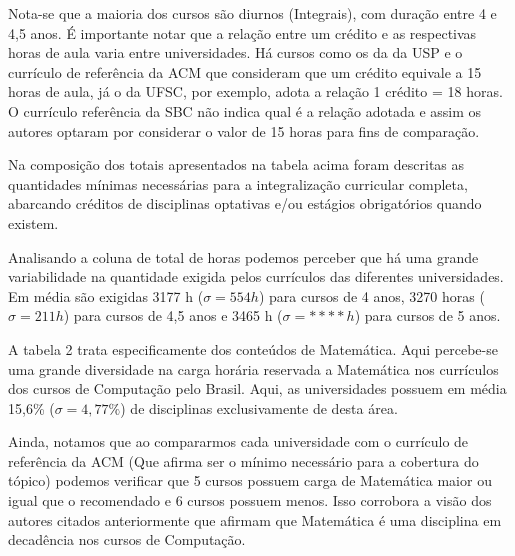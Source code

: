 \documentclass[conference]{IEEEtran}
\begin{document}
	Nota-se que a maioria dos cursos são diurnos (Integrais), com duração entre 4 e 4,5 anos. É importante notar que a relação entre um crédito e as respectivas horas de aula varia entre universidades. Há cursos como os da da USP e o currículo de referência da ACM que consideram que um crédito equivale a 15 horas de aula, já o da UFSC, por exemplo, adota a relação 1 crédito = 18 horas. O currículo referência da SBC não indica qual é a relação adotada e assim os autores optaram por considerar o valor de 15 horas para fins de comparação.

	Na composição dos totais apresentados na tabela acima foram descritas as quantidades mínimas necessárias para a integralização curricular completa, abarcando créditos de disciplinas optativas e/ou estágios obrigatórios quando existem. 

	Analisando a coluna de total de horas podemos perceber que há uma grande variabilidade na quantidade exigida pelos currículos das diferentes universidades. Em média são exigidas 3177 h ($\sigma = 554 h $) para cursos de 4 anos, 3270 horas ($\sigma = 211 h$) para cursos de 4,5 anos e 3465 h ($\sigma = **** h$) para cursos de 5 anos.

	A tabela 2 trata especificamente dos conteúdos de Matemática. Aqui percebe-se uma grande diversidade na carga horária reservada a Matemática nos currículos dos cursos de Computação pelo Brasil. Aqui, as universidades possuem em média 15,6\% ($\sigma = 4,77 \%$) de disciplinas exclusivamente de desta área.

	Ainda, notamos que ao compararmos cada universidade com o currículo de referência da ACM (Que afirma ser o mínimo necessário para a cobertura do tópico) podemos verificar que 5 cursos possuem carga de Matemática maior ou igual que o recomendado e 6 cursos possuem menos. Isso corrobora a visão dos autores citados anteriormente que afirmam que Matemática é uma disciplina em decadência nos cursos de Computação.
\end{document}
